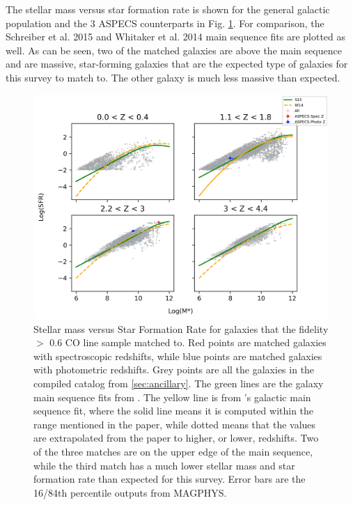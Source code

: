 The stellar mass versus star formation rate is shown for the general galactic population and the 3 ASPECS counterparts in Fig. \ref{fig:Cross_match}. For comparison, the Schreiber et al. 2015 \cite{schreiber2015herschel} and Whitaker et al. 2014 \cite{Whitaker_2014} main sequence fits are plotted as well. As can be seen, two of the matched galaxies are above the main sequence and are massive, star-forming galaxies that are the expected type of galaxies for this survey to match to. The other galaxy is much less massive than expected. 

\begin{figure}[!htbp]
\centering \includegraphics[width=120mm]{Survey/No_Cut_Mstar_vs_SFR_all_closest_sep_1_0_sn_fid_60.png}
\caption{Stellar mass versus Star Formation Rate for galaxies that the fidelity $>$ 0.6 CO line sample matched to. Red points are matched galaxies with spectroscopic redshifts, while blue points are matched galaxies with photometric redshifts. Grey points are all the galaxies in the compiled catalog from \ref{sec:ancillary}. The green lines are the galaxy main sequence fits from \cite{schreiber2015herschel}. The yellow line is from \cite{Whitaker_2014}'s galactic main sequence fit, where the solid line means it is computed within the range mentioned in the paper, while dotted means that the values are extrapolated from the paper to higher, or lower, redshifts. Two of the three matches are on the upper edge of the main sequence, while the third match has a much lower stellar mass and star formation rate than expected for this survey. Error bars are the 16/84th percentile outputs from MAGPHYS.}
\label{fig:Cross_match}
\end{figure}

